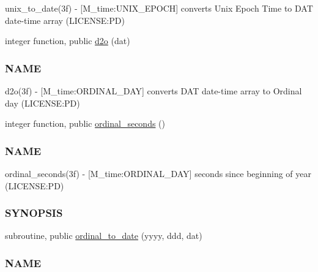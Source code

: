 \begin{DoxyCompactItemize}
\begin{DoxyCompactList}
unix\+\_\+to\+\_\+date(3f) -\/ \mbox{[}M\+\_\+time\+:U\+N\+I\+X\+\_\+\+E\+P\+O\+CH\mbox{]} converts Unix Epoch Time to D\+AT date-\/time array (L\+I\+C\+E\+N\+SE\+:PD) \end{DoxyCompactList}\item 
integer function, public \mbox{\hyperlink{namespacem__time_a727dd77bbd4a5d0e3947c5d303845947}{d2o}} (dat)
\begin{DoxyCompactList}\small\item\em \subsubsection*{N\+A\+ME}

d2o(3f) -\/ \mbox{[}M\+\_\+time\+:O\+R\+D\+I\+N\+A\+L\+\_\+\+D\+AY\mbox{]} converts D\+AT date-\/time array to Ordinal day (L\+I\+C\+E\+N\+SE\+:PD) \end{DoxyCompactList}\item 
integer function, public \mbox{\hyperlink{namespacem__time_ab8960d2aa60e134bcf77247d8b257963}{ordinal\+\_\+seconds}} ()
\begin{DoxyCompactList}\small\item\em \subsubsection*{N\+A\+ME}

ordinal\+\_\+seconds(3f) -\/ \mbox{[}M\+\_\+time\+:O\+R\+D\+I\+N\+A\+L\+\_\+\+D\+AY\mbox{]} seconds since beginning of year (L\+I\+C\+E\+N\+SE\+:PD) \subsubsection*{S\+Y\+N\+O\+P\+S\+IS}\end{DoxyCompactList}\item 
subroutine, public \mbox{\hyperlink{namespacem__time_aa4dca4409bf20a011bb04988c1335d63}{ordinal\+\_\+to\+\_\+date}} (yyyy, ddd, dat)
\begin{DoxyCompactList}\small\item\em \subsubsection*{N\+A\+ME}


\end{DoxyCompactList}
\end{DoxyCompactItemize}
